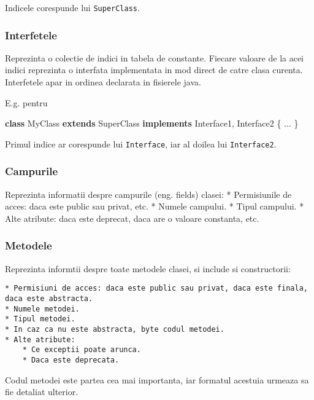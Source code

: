 \documentclass[]{article}
\newenvironment{Shaded}{}{}
\newcommand{\KeywordTok}[1]{\textcolor[rgb]{0.00,0.44,0.13}{\textbf{#1}}}
\newcommand{\NormalTok}[1]{#1}
\begin{document}
Indicele corespunde lui \texttt{SuperClass}.

\subsubsection{Interfetele}\label{interfetele}

Reprezinta o colectie de indici in tabela de constante. Fiecare valoare
de la acei indici reprezinta o interfata implementata in mod direct de
catre clasa curenta. Interfetele apar in ordinea declarata in fisierele
java.

E.g. pentru

\begin{Shaded}
	\begin{Highlighting}[]
		\KeywordTok{class}\NormalTok{ MyClass }\KeywordTok{extends}\NormalTok{ SuperClass }\KeywordTok{implements}\NormalTok{ Interface1, Interface2 \{}
		\NormalTok{    ...}
		\NormalTok{\}}
	\end{Highlighting}
\end{Shaded}

Primul indice ar corespunde lui \texttt{Interface}, iar al doilea lui
\texttt{Interface2}.

\subsubsection{Campurile}\label{campurile}

Reprezinta informatii despre campurile (eng. fields) clasei: *
Permisiunile de acces: daca este public sau privat, etc. * Numele
campului. * Tipul campului. * Alte atribute: daca este deprecat, daca
are o valoare constanta, etc.

\subsubsection{Metodele}\label{metodele}

Reprezinta informtii despre toate metodele clasei, si include si
constructorii:

\begin{verbatim}
* Permisiuni de acces: daca este public sau privat, daca este finala, daca este abstracta.
* Numele metodei.
* Tipul metodei.
* In caz ca nu este abstracta, byte codul metodei.
* Alte atribute:
    * Ce exceptii poate arunca.
    * Daca este deprecata.
\end{verbatim}

Codul metodei este partea cea mai importanta, iar formatul acestuia
urmeaza sa fie detaliat ulterior.
\end{document}
